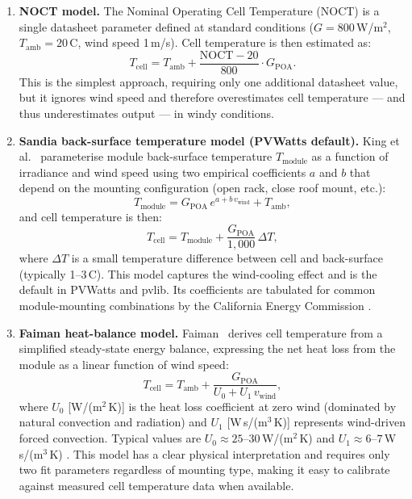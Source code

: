 \documentclass[11pt,a4paper]{report}
\begin{document}
\begin{enumerate}
    \item \textbf{NOCT model.}
    The Nominal Operating Cell Temperature (NOCT) is a single datasheet parameter defined at standard conditions ($G = 800$\,W/m$^2$, $T_{\text{amb}} = 20$\,\textdegree C, wind speed 1\,m/s).
    Cell temperature is then estimated as:
    \begin{equation}
        T_{\text{cell}} = T_{\text{amb}} + \frac{\text{NOCT} - 20}{800} \cdot G_{\text{POA}}.
        \label{eq:noct}
    \end{equation}
    This is the simplest approach, requiring only one additional datasheet value, but it ignores wind speed and therefore overestimates cell temperature --- and thus underestimates output --- in windy conditions.

    \item \textbf{Sandia back-surface temperature model (PVWatts default).}
    King et al.~\cite{Dobos2012ImprovedCEC} parameterise module back-surface temperature $T_{\text{module}}$ as a function of irradiance and wind speed using two empirical coefficients $a$ and $b$ that depend on the mounting configuration (open rack, close roof mount, etc.):
    \begin{equation}
        T_{\text{module}} = G_{\text{POA}}\,e^{a + b\,v_{\text{wind}}} + T_{\text{amb}},
        \label{eq:sandia_tmod}
    \end{equation}
    and cell temperature is then:
    \begin{equation}
        T_{\text{cell}} = T_{\text{module}} + \frac{G_{\text{POA}}}{1{,}000}\,\Delta T,
        \label{eq:sandia_tcell}
    \end{equation}
    where $\Delta T$ is a small temperature difference between cell and back-surface (typically 1--3\,\textdegree C).
    This model captures the wind-cooling effect and is the default in PVWatts and pvlib.
    Its coefficients are tabulated for common module-mounting combinations by the California Energy Commission \cite{Dobos2012ImprovedCEC}.

    \item \textbf{Faiman heat-balance model.}
    Faiman~\cite{Faiman2008} derives cell temperature from a simplified steady-state energy balance, expressing the net heat loss from the module as a linear function of wind speed:
    \begin{equation}
        T_{\text{cell}} = T_{\text{amb}} + \frac{G_{\text{POA}}}{U_0 + U_1\,v_{\text{wind}}},
        \label{eq:faiman}
    \end{equation}
    where $U_0$ [W/(m$^2$\,K)] is the heat loss coefficient at zero wind (dominated by natural convection and radiation) and $U_1$ [W\,s/(m$^3$\,K)] represents wind-driven forced convection.
    Typical values are $U_0 \approx 25$--$30$\,W/(m$^2$\,K) and $U_1 \approx 6$--$7$\,W\,s/(m$^3$\,K) \cite{Faiman2008}.
    This model has a clear physical interpretation and requires only two fit parameters regardless of mounting type, making it easy to calibrate against measured cell temperature data when available.
\end{enumerate}
\end{document}

